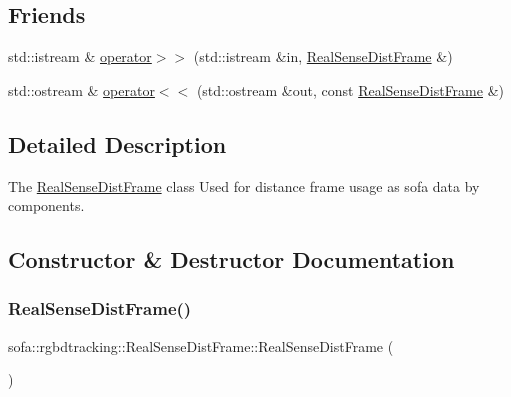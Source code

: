 \subsection*{Friends}
\begin{DoxyCompactItemize}
\item 
std\+::istream \& \hyperlink{classsofa_1_1rgbdtracking_1_1_real_sense_dist_frame_ac7776007f9ac565bc64143b9c2e29c7d}{operator$>$$>$} (std\+::istream \&in, \hyperlink{classsofa_1_1rgbdtracking_1_1_real_sense_dist_frame}{Real\+Sense\+Dist\+Frame} \&)
\item 
std\+::ostream \& \hyperlink{classsofa_1_1rgbdtracking_1_1_real_sense_dist_frame_ad9831ad196082e583b86e863ec7d3460}{operator$<$$<$} (std\+::ostream \&out, const \hyperlink{classsofa_1_1rgbdtracking_1_1_real_sense_dist_frame}{Real\+Sense\+Dist\+Frame} \&)
\end{DoxyCompactItemize}


\subsection{Detailed Description}
The \hyperlink{classsofa_1_1rgbdtracking_1_1_real_sense_dist_frame}{Real\+Sense\+Dist\+Frame} class Used for distance frame usage as sofa data by components. 

\subsection{Constructor \& Destructor Documentation}
\mbox{\label{classsofa_1_1rgbdtracking_1_1_real_sense_dist_frame_a3d49568e24334c3381cc363987bcf459}} 
\subsubsection{\texorpdfstring{Real\+Sense\+Dist\+Frame()}{RealSenseDistFrame()}\hspace{0.1cm}{\footnotesize\ttfamily [1/2]}}
{\footnotesize\ttfamily sofa\+::rgbdtracking\+::\+Real\+Sense\+Dist\+Frame\+::\+Real\+Sense\+Dist\+Frame (\begin{DoxyParamCaption}{ }\end{DoxyParamCaption})\hspace{0.3cm}{\ttfamily [inline]}}

